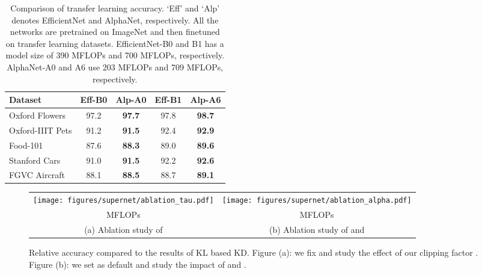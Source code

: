 \documentclass{article}
\begin{document}
\begin{table}[t]
    \centering
    \setlength{\tabcolsep}{2pt}
    \begin{tabular}{l|cc|cc}
    \hline 
    Dataset &  Eff-B0 & Alp-A0 & Eff-B1 & Alp-A6 \\ \hline 
Oxford Flowers & 97.2 & \bf{97.7} & 97.8 & \bf 98.7 \\
    Oxford-IIIT Pets& 91.2 & \bf{91.5} & 92.4 & \bf 92.9\\
    Food-101 & 87.6  & \bf{88.3} & 89.0 & \bf 89.6\\
    Stanford Cars & 91.0& \bf{91.5} & 92.2 & \bf 92.6\\
    FGVC Aircraft & 88.1  & \bf{88.5} & 88.7 & \bf 89.1\\
    \hline 
    \end{tabular}
    \caption{
    Comparison of transfer learning accuracy.
    `Eff' and `Alp' denotes EfficientNet and AlphaNet, respectively.
    All the networks are pretrained on ImageNet and then finetuned on transfer learning datasets. 
    EfficientNet-B0 and B1 has a model size of 390 MFLOPs and 700 MFLOPs, respectively. AlphaNet-A0 and A6 use 203 MFLOPs  and 709 MFLOPs, respectively. 
    }
    \vspace{-10pt}
    \label{tab:transfer_learning}
\end{table}



\begin{figure*}[ht]
\centering
\begin{tabular}{cc}
\raisebox{2.5em}{\rotatebox{90}{\small Relative Accuracy}}
\texttt{[image: figures/supernet/ablation\_tau.pdf]} &
\raisebox{2.5em}{\rotatebox{90}{\small Relative Accuracy}}
\texttt{[image: figures/supernet/ablation\_alpha.pdf]} \\
\small MFLOPs  & \small MFLOPs \\
\small (a) Ablation study of  & \small (b) Ablation study of  and \\
\end{tabular}
\vspace{-0.5em}
\caption{Relative accuracy compared to the results of KL based KD. 
Figure (a): we fix  and study the effect of our clipping factor . 
Figure (b): we set  as default and study the impact of  and . 
}
\label{fig:abla_alpha}
\end{figure*}
\end{document}
